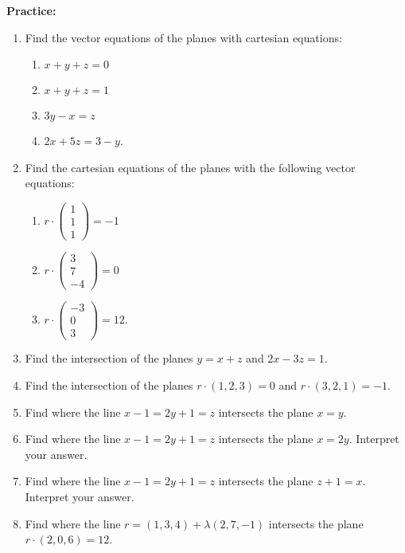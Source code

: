 \documentclass{article}
\begin{document}
\textbf{Practice:}\bigskip



\begin{enumerate}
	\item Find the vector equations of the planes with cartesian equations:
		\begin{enumerate}
			\item $x+y+z=0$
			\item $x+y+z=1$
			\item $3y-x=z$
			\item $2x+5z=3-y$.
		\end{enumerate}
	\item Find the cartesian equations of the planes with the following vector equations:
		\begin{enumerate}
			\item $r\cdot\left(\begin{array}{c} 1\\1\\1\end{array}\right)=-1$
			\item $r\cdot\left(\begin{array}{c} 3\\7\\-4\end{array}\right)=0$
			\item $r\cdot\left(\begin{array}{c} -3\\0\\3\end{array}\right)=12$.
		\end{enumerate}
	\item Find the intersection of the planes $y=x+z$ and $2x-3z=1$.
	\item Find the intersection of the planes $r\cdot(1,2,3)=0$ and $r\cdot (3,2,1)=-1$.
	\item Find where the line $x-1=2y+1=z$ intersects the plane $x=y$.
	\item Find where the line $x-1=2y+1=z$ intersects the plane $x=2y$. Interpret your answer.
	\item Find where the line $x-1=2y+1=z$ intersects the plane $z+1=x$. Interpret your answer.
	\item Find where the line $r=(1,3,4) + \lambda (2,7,-1)$ intersects the plane $r\cdot (2,0,6)=12$.
\end{enumerate}



\clearpage
\end{document}

